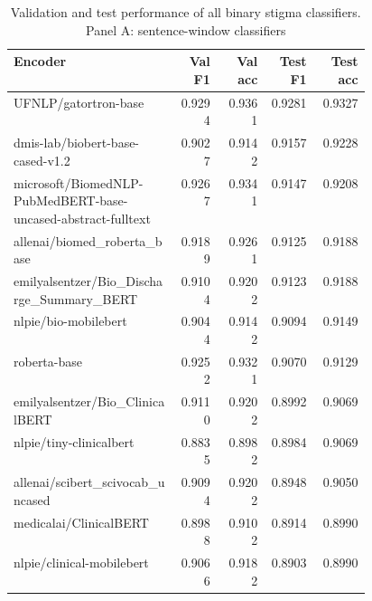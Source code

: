 \documentclass[unnumsec,webpdf,contemporary,large]{oup-authoring-template}
\begin{document}
\begin{table}[H]
\caption{Validation and test performance of all binary stigma classifiers. Panel A: sentence-window classifiers}
\label{tab:s_classifier}
\footnotesize
\setlength{\tabcolsep}{3pt}
\begin{tabular}{@{}p{0.46\linewidth}rrrr@{}}
\toprule
Encoder & Val F1 & Val acc & Test F1 & Test acc \\
\midrule
UFNLP/gatortron-base & 0.9294 & 0.9361 & 0.9281 & 0.9327 \\
dmis-lab/biobert-base-cased-v1.2 & 0.9027 & 0.9142 & 0.9157 & 0.9228 \\
microsoft/BiomedNLP-PubMedBERT-base-uncased-abstract-fulltext & 0.9267 & 0.9341 & 0.9147 & 0.9208 \\
allenai/biomed\_roberta\_base & 0.9189 & 0.9261 & 0.9125 & 0.9188 \\
emilyalsentzer/Bio\_Discharge\_Summary\_BERT & 0.9104 & 0.9202 & 0.9123 & 0.9188 \\
nlpie/bio-mobilebert & 0.9044 & 0.9142 & 0.9094 & 0.9149 \\
roberta-base & 0.9252 & 0.9321 & 0.9070 & 0.9129 \\
emilyalsentzer/Bio\_ClinicalBERT & 0.9110 & 0.9202 & 0.8992 & 0.9069 \\
nlpie/tiny-clinicalbert & 0.8835 & 0.8982 & 0.8984 & 0.9069 \\
allenai/scibert\_scivocab\_uncased & 0.9094 & 0.9202 & 0.8948 & 0.9050 \\
medicalai/ClinicalBERT & 0.8988 & 0.9102 & 0.8914 & 0.8990 \\
nlpie/clinical-mobilebert & 0.9066 & 0.9182 & 0.8903 & 0.8990 \\
\bottomrule
\end{tabular}
\end{table}
\end{document}

